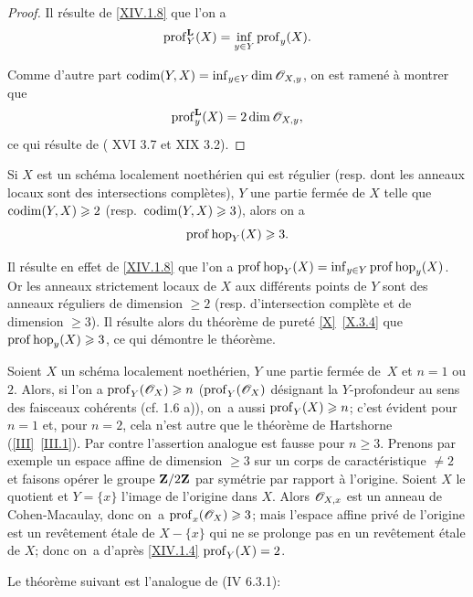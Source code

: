 \begin{proof}
Il r\'esulte de \ref{XIV.1.8} que l'on a
$$
\operatorname{prof}_Y^{\mathbf{L}}(X)=\inf_{y\in Y} \operatorname{prof}_y(X).
$$

Comme d'autre part $\operatorname{codim}(Y, X)=\inf_{y\in Y} \dim {\mathscr O}_{X, y}$, on est ramen\'e \`a montrer que
$$
\operatorname{prof}_y^{\mathbf{L}}(X)=2 \dim {\mathscr O}_{X, y},
$$
ce qui r\'esulte de ( XVI 3.7 et XIX 3.2).
\skipqed
\end{proof}

\begin{theoreme} \label{XIV.1.11}
Si $X$ est un sch\'ema localement noeth\'erien qui est r\'egulier (resp. dont les anneaux locaux sont des intersections compl\`etes), $Y$ une partie ferm\'ee de $X$ telle que $\operatorname{codim}(Y, X)\geqslant 2$ (resp.\ \hbox{$\operatorname{codim}(Y, X)\geqslant3$}), alors on a
$$
\operatorname{prof} \operatorname{hop}_Y(X)\geqslant 3.
$$
\end{theoreme}

Il r\'esulte en effet de \ref{XIV.1.8} que l'on a $\operatorname{prof} \operatorname{hop}_Y(X)=\inf_{y\in Y} \operatorname{prof} \operatorname{hop}_y(X)$. Or les anneaux strictement locaux de $X$ aux diff\'erents points de $Y$ sont des anneaux r\'eguliers de dimension $\geq 2$ (resp. d'intersection compl\`ete et de dimension $\geq 3$). Il r\'esulte alors du th\'eor\`eme de puret\'e \ref{X}~\ref{X.3.4} que $\operatorname{prof} \operatorname{hop}_y(X)\geqslant 3$, ce qui d\'emontre le th\'eor\`eme.

\begin{exemple} \label{XIV.1.12}
Soient $X$ un sch\'ema localement noeth\'erien, $Y$ une partie ferm\'ee de~$X$ et $n=1$ ou $2$. Alors, si l'on a $\operatorname{prof}_Y(\mathscr{O}_X)\geqslant n$ ($\operatorname{prof}_Y(\mathscr{O}_X)$ d\'esignant la $Y$-profondeur au sens des faisceaux coh\'erents (cf. 1.6 a)), on~a aussi $\operatorname{prof}_Y(X)\geqslant n$; c'est \'evident pour $n=1$ et, pour $n=2$, cela n'est autre que le th\'eor\`eme de Hartshorne (\ref{III}~\ref{III.1}). Par contre l'assertion analogue est fausse pour $n\geq 3$. Prenons par exemple un espace affine de dimension $\geq 3$ sur un corps de caract\'eristique $\neq 2$ et faisons op\'erer le groupe $\mathbf{Z}/2\mathbf{Z}$ par sym\'etrie par rapport \`a l'origine. Soient $X$ le quotient et $Y=\{x\}$ l'image de l'origine dans $X$. Alors ${\mathscr O}_{X, x}$ est un anneau de Cohen-Macaulay, donc on~a $\operatorname{prof}_x(\mathscr{O}_X)\geqslant 3$; mais l'espace affine priv\'e de l'origine est un rev\^etement \'etale de $X-\{x\}$ qui ne se prolonge pas en un rev\^etement \'etale de $X$; donc on~a d'apr\`es \ref{XIV.1.4} $\operatorname{prof}_Y(X)=2$.
\end{exemple}

Le th\'eor\`eme suivant est l'analogue de (\EGA IV 6.3.1):

